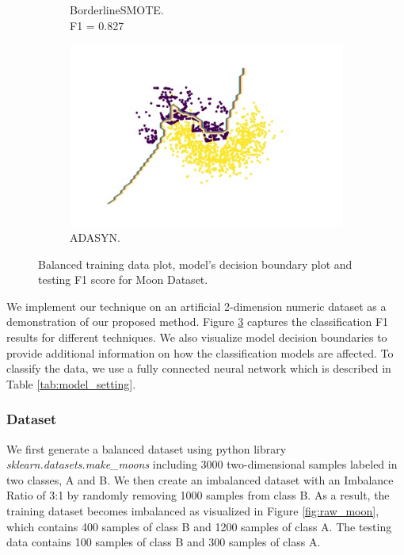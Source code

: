 \begin{figure}[tp]
\begin{subfigure}[]{0.3\linewidth}
		\caption{BorderlineSMOTE.\\F1 = 0.827}
		\label{fig:border_smote_moon}
	\end{subfigure}
	\hspace{0.1em}%
	\begin{subfigure}[]{0.3\linewidth}
		\includegraphics[width=\linewidth]{Figures/moon/AdaSYN}
		\caption{ADASYN.\\   }
		\label{fig:adasyn_moon}
	\end{subfigure}
	
	\caption{Balanced training data plot, model's decision boundary plot and testing F1 score for Moon Dataset.}
	\label{fig:MoonResults}
\end{figure}


We implement our technique on an artificial 2-dimension numeric dataset as a demonstration of our proposed method. Figure \ref{fig:MoonResults} captures the classification F1 results for different techniques. We also visualize model decision boundaries to provide additional information on how the classification models are affected. To classify the data, we use a fully connected neural network which is described in Table \ref{tab:model_setting}.

\subsubsection{Dataset}

We first generate a balanced dataset using python library \textit{sklearn.datasets.make\_moons} including 3000 two-dimensional samples labeled in two classes, A and B. We then create an imbalanced dataset with an Imbalance Ratio of 3:1 by randomly removing 1000 samples from class B. As a result, the training dataset becomes imbalanced as visualized in Figure \ref{fig:raw_moon}, which contains 400 samples of class B and 1200 samples of class A. The testing data contains 100 samples of class B and 300 samples of class A. 


